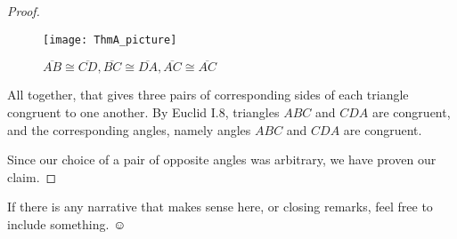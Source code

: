\begin{proof}
\setcounter{figure}{0}
\begin{figure}[H]%
\centering
\texttt{[image: ThmA\_picture]}
\label{fig:A.1}
\caption{$\overline{AB} \cong \overline{CD}, \overline{BC} \cong \overline{DA}, \overline{AC} \cong \overline{AC}$}
\end{figure}

All together, that gives three pairs of corresponding sides of each triangle congruent to one another.  By Euclid I.8, triangles $ABC$ and $CDA$ are congruent, and the corresponding angles, namely angles $ABC$ and $CDA$ are congruent.

Since our choice of a pair of opposite angles was arbitrary, we have proven our claim.

\end{proof}

If there is any narrative that makes sense here, or closing remarks, feel free to include something.  $\smiley$




